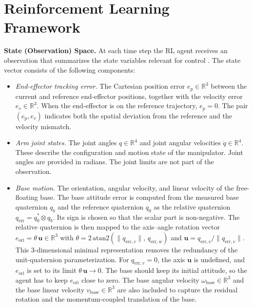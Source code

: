 \documentclass{ieeeaccess}
\begin{document}
\section{Reinforcement Learning Framework}\label{RL}
\textbf{State (Observation) Space.} At each time step the RL agent receives an observation that
summarizes the state variables relevant for control \cite{b7}. The state vector consists of the
following components:
\begin{itemize}
  \item \textit{End-effector tracking error.} The Cartesian position error $e_p \in \mathbb{R}^3$ between the current
  and reference end-effector positions, together with the velocity error $e_v \in \mathbb{R}^3$. When the
end-effector is on the reference trajectory, $e_p = 0$. The pair $(e_p, e_v)$
indicates both the spatial deviation from the reference and the velocity mismatch.
  \item \textit{Arm joint states.} The joint angles $q \in \mathbb{R}^4$ and joint angular velocities
  $\dot{q} \in \mathbb{R}^4$. These describe the configuration and motion state of the manipulator. Joint
  angles are provided in radians. The joint limits are not part of the observation.
  \item \textit{Base motion.} The orientation, angular velocity, and linear velocity of the free-floating
  base. The base attitude error is computed from the measured base quaternion $q_b$ and the reference
  quaternion $q_0$ as the relative quaternion $q_{\mathrm{err}} = q_0^{*} \otimes q_b$. Its sign is
  chosen so that the scalar part is non-negative. The relative quaternion is then mapped to the
  axis--angle rotation vector $e_{\mathrm{ori}} = \theta\,\mathbf{u} \in \mathbb{R}^3$ with
  $\theta = 2\,\mathrm{atan2}(\|q_{\mathrm{err},v}\|,\,q_{\mathrm{err},w})$ and
  $\mathbf{u} = q_{\mathrm{err},v}/\|q_{\mathrm{err},v}\|$. This 3-dimensional minimal representation
  removes the redundancy of the unit-quaternion parameterization. For $q_{\mathrm{err},v} = 0$, the axis
  $\mathbf{u}$ is undefined, and $e_{\mathrm{ori}}$ is set to its limit $\theta\,\mathbf{u} \to 0$. The
  base should keep its initial attitude, so the agent has to keep $e_{\mathrm{ori}}$ close to zero. The
  base angular velocity
  $\omega_{\mathrm{base}} \in \mathbb{R}^3$ and the base linear velocity
  $v_{\mathrm{base}} \in \mathbb{R}^3$ are also included to capture the residual rotation and the
  momentum-coupled translation of the base.
\end{itemize}
\end{document}
